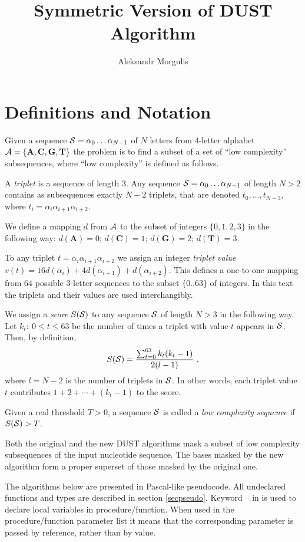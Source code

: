 \documentclass{article}
\title{Symmetric Version of DUST Algorithm}
\author{Aleksandr Morgulis}
\newcommand{\al}[1]{\alpha_{#1}}
\newcommand{\sq}[2]{\al{#1}\ldots\al{#2}}
\newcommand{\cala}{{\cal A}}
\newcommand{\cals}{{\cal S}}
\newcommand{\VARP}{\keyword{var}\ }
\begin{document}
\maketitle
\tableofcontents

\section{Definitions and Notation}

Given a sequence ${\cal S} = \sq{0}{N-1}$ of $N$ letters from $4$-letter 
alphabet $\cala = \{ \mathbf A, \mathbf C, \mathbf G, \mathbf T \}$ the problem 
is to find a subset of a set of ``low complexity'' subsequences, where 
``low complexity'' is defined as follows.

A {\em triplet} is a sequence of length $3$. Any sequence $\cals = \sq{0}{N-1}$ 
of length $N > 2$ contains as subsequences exactly $N-2$ triplets, that are 
denoted $t_{0},\ldots,t_{N-3}$, where $t_i = \al{i}\al{i+1}\al{i+2}$.

We define a mapping $d$ from $\cala$ to the subset of integers 
$\{0, 1, 2, 3\}$ in the following way: $d(\mathbf A) = 0$; $d(\mathbf C) = 1$; 
$d(\mathbf G) = 2$; $d(\mathbf T) = 3$.

To any triplet $t = \al{i}\al{i+1}\al{i+2}$ we assign an integer 
{\em triplet value} $v(t) = 16d(\al{i}) + 4d(\al{i+1}) + d(\al{i+2})$. This 
defines a one-to-one mapping from $64$ possible 3-letter sequences to the subset 
$\{0..63\}$ of integers.  In this text the triplets and their values are used 
interchangibly.

We assign a {\em score} $S(\cals)$ to any sequence $\cals$ of length $N > 3$ in 
the following way. Let $k_t :\ 0 \le t \le 63$ be the number of times a triplet 
with value $t$ appears in $\cals$. Then, by definition,
$$
S(\cals) = \frac{\sum_{t=0}^{63}{k_t(k_t - 1)}}{2(l - 1)} \rm{\ ,}
$$
where $l = N - 2$ is the number of triplets in $\cals$. In other words, each
triplet value $t$ contributes $1 + 2 + \cdots + (k_t - 1)$ to the score.

Given a real threshold $T > 0$, a sequence $\cals$ is called a {\em low 
complexity sequence} if $S(\cals) > T$.

Both the original and the new DUST algorithms mask a subset of low complexity
subsequences of the input nucleotide sequence. The bases masked by the new
algorithm form a proper superset of those masked by the original one.

The algorithms below are presented in Pascal-like pseudocode. All undeclared
functions and types are described in section \ref{secpseudo}. Keyword \VARP
in is used to declare local variables in procedure/function. When used in
the procedure/function parameter list it means that the corresponding parameter
is passed by reference, rather than by value.
\end{document}
